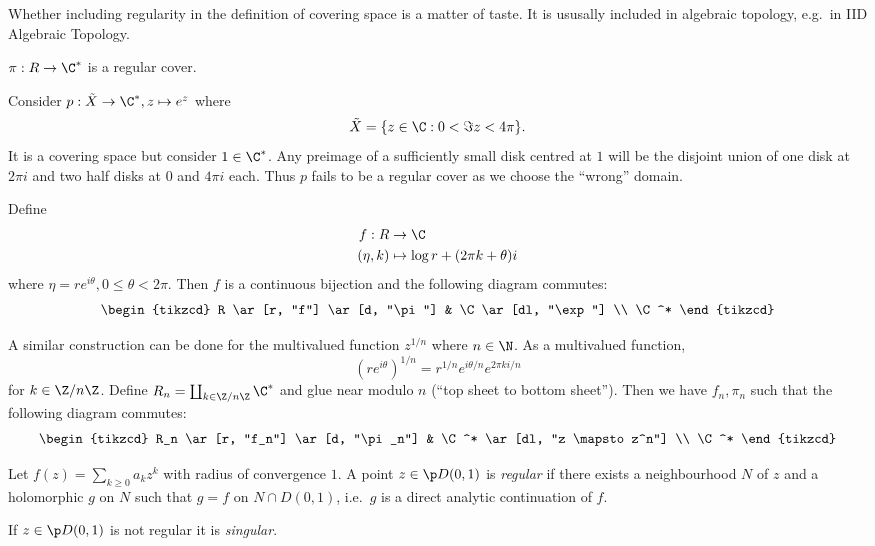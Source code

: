 \documentclass[a4paper]{article}
\begin{document}
\begin{note}
  Whether including regularity in the definition of covering space is a matter of taste. It is ususally included in algebraic topology, e.g.\ in IID Algebraic Topology.
\end{note}

\begin{remark}
  \(\pi: R \to \C^*\) is a regular cover.
\end{remark}

\begin{eg}
  Consider \(p: \tilde X \to \C^*, z \mapsto e^z\) where
  \[
    \tilde X = \{z \in \C: 0 < \Im z < 4\pi\}.
  \]
  It is a covering space but consider \(1 \in \C^*\). Any preimage of a sufficiently small disk centred at \(1\) will be the disjoint union of one disk at \(2\pi i\) and two half disks at \(0\) and \(4\pi i\) each. Thus \(p\) fails to be a regular cover as we choose the ``wrong'' domain.
\end{eg}

Define
\begin{align*}
  f: R &\to \C \\
  (\eta, k) &\mapsto \log r + (2\pi k + \theta) i
\end{align*}
where \(\eta = re^{i\theta}, 0 \leq \theta < 2\pi\). Then \(f\) is a continuous bijection and the following diagram commutes:
\[
  \begin{tikzcd}
    R \ar[r, "f"] \ar[d, "\pi"] & \C \ar[dl, "\exp"] \\
    \C^*
  \end{tikzcd}
\]

A similar construction can be done for the multivalued function \(z^{1/n}\) where \(n \in \N\). As a multivalued function,
\[
  (r e^{i\theta})^{1/n} = r^{1/n} e^{i\theta/n} e^{2\pi ki/n}
\]
for \(k \in \Z/n\Z\). Define \(R_n = \coprod_{k \in \Z/n\Z} \C^*\) and glue near modulo \(n\) (``top sheet to bottom sheet''). Then we have \(f_n, \pi_n\) such that the following diagram commutes:
\[
  \begin{tikzcd}
    R_n \ar[r, "f_n"] \ar[d, "\pi_n"] & \C^* \ar[dl, "z \mapsto z^n"] \\
    \C^*
  \end{tikzcd}
\]

\begin{definition}
  Let \(f(z) = \sum_{k \geq 0} a_k z^k\) with radius of convergence \(1\). A point \(z \in \p D(0, 1)\) is \emph{regular} if there exists a neighbourhood \(N\) of \(z\) and a holomorphic \(g\) on \(N\) such that \(g = f\) on \(N \cap D(0, 1)\), i.e.\ \(g\) is a direct analytic continuation of \(f\).

  If \(z \in \p D(0, 1)\) is not regular it is \emph{singular}.
\end{definition}
\end{document}
